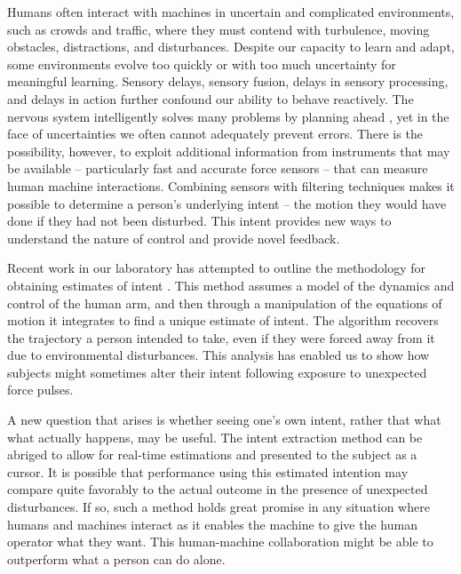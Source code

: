 \documentclass{frontiersSCNS} %
\begin{document}
Humans often interact with machines in uncertain and complicated environments, such as crowds and traffic, where they must contend with turbulence, moving obstacles, distractions, and disturbances. Despite our capacity to learn and adapt, some environments evolve too quickly or with too much uncertainty for meaningful learning. Sensory delays, sensory fusion, delays in sensory processing, and delays in action further confound our ability to behave reactively. The nervous system intelligently solves many problems by planning ahead \citep{belen1967control}, yet in the face of uncertainties we often cannot adequately prevent errors. There is the possibility, however, to exploit additional information from instruments that may be available -- particularly fast and accurate force sensors -- that can measure human machine interactions. Combining sensors with filtering techniques makes it possible to determine a person’s underlying intent -- the motion they would have done if they had not been disturbed. This intent provides new ways to understand the nature of control and provide novel feedback. 

Recent work in our laboratory has attempted to outline the methodology for obtaining estimates of intent \citep{horowitz2015determining}. This method assumes a model of the dynamics and control of the human arm, and then through a manipulation of the equations of motion it integrates to find a unique estimate of intent. The algorithm recovers the trajectory a person intended to take, even if they were forced away from it due to environmental disturbances. This analysis has enabled us to show how subjects might sometimes alter their intent following exposure to unexpected force pulses. 

A new question that arises is whether seeing one’s own intent, rather that what what actually happens, may be useful. The intent extraction method can be abriged to allow for real-time estimations and presented to the subject as a cursor. It is possible that performance using this estimated intention may compare quite favorably to the actual outcome in the presence of unexpected disturbances. If so, such a method holds great promise in any situation where humans and machines interact as it enables the machine to give the human operator what they want. This human-machine collaboration might be able to outperform what a person can do alone.
\end{document}
